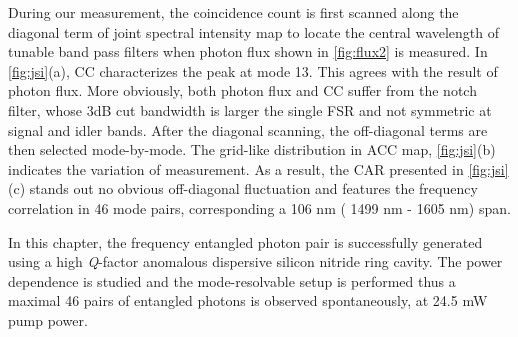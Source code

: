 During our measurement, the coincidence count is first scanned along the diagonal term of joint spectral intensity map to locate the central wavelength of tunable band pass filters when photon flux shown in \autoref{fig:flux2} is measured. In \autoref{fig:jsi}(a), CC characterizes the peak at mode 13. This agrees with the result of photon flux. More obviously, both photon flux and CC suffer from the notch filter, whose 3dB cut bandwidth is larger the single FSR and not symmetric at signal and idler bands. After the diagonal scanning, the off-diagonal terms are then selected mode-by-mode. The grid-like distribution in ACC map, \autoref{fig:jsi}(b) indicates the variation of measurement.
As a result, the CAR presented in \autoref{fig:jsi}(c) stands out no obvious off-diagonal fluctuation and features the frequency correlation in 46 mode pairs, corresponding a 106 nm ( 1499 nm - 1605 nm) span.

\begin{figure}
	\centering
	
	\label{fig:flux2}
\end{figure}

\begin{figure}
	\centering
	
	\label{fig:jsi}
\end{figure}

\bigskip
In this chapter, the frequency entangled photon pair is successfully generated using a high \textit{Q}-factor anomalous dispersive silicon nitride ring cavity. The power dependence is studied and the mode-resolvable setup is performed thus a maximal 46 pairs of entangled photons is observed spontaneously, at 24.5 mW pump power.

